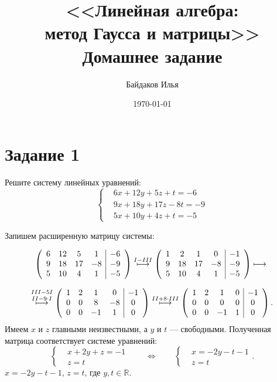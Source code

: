 \documentclass[a4paper,12pt]{article}
\begin{document}
\title{<<Линейная алгебра:\\ метод Гаусса и матрицы>>\\ \vspace{12pt} Домашнее задание}
\author{Байдаков Илья}
\date{\today}
\maketitle


\section*{Задание 1}
Решите систему линейных уравнений:
$$
\left\{
\begin{aligned}
&6x + 12y + 5z + t = -6\\
&9x + 18y + 17z -8t = -9\\
&5x + 10y + 4z + t = -5
\end{aligned}
\right.
$$

 Запишем расширенную матрицу системы:

$$ \left(\begin{array}{cccc|c}
6 & 12 & 5 & 1 & -6 \\
9 & 18 & 17 & -8 & -9 \\
5 & 10 & 4 & 1 & -5
\end{array} \right)
\overset{I-III}{\longmapsto}
\left(\begin{array}{cccc|c}
1 & 2 & 1 & 0 & -1 \\
9 & 18 & 17 & -8 & -9 \\
5 & 10 & 4 & 1 & -5
\end{array} \right)
\longmapsto \\ $$

$$ \overset{III-5I}{\overset{II-9\cdot I}{\longmapsto}}
\left(\begin{array}{cccc|c}
1 & 2 & 1 & 0 & -1 \\
0 & 0 & 8 & -8 & 0 \\
0 & 0 & -1 & 1 & 0
\end{array} \right)
\overset{II+8\cdot III}{\longmapsto}
\left(\begin{array}{cccc|c}
1 & 2 & 1 & 0 & -1 \\
0 & 0 & 0 & 0 & 0 \\
0 & 0 & -1 & 1 & 0
\end{array} \right).\\ $$
Имеем $x$ и $z$ главными неизвестными, а $y$ и $t$ --- свободными. Полученная матрица соответствует системе уравнений:
$$
\left\{
\begin{aligned}
&x + 2y + z = -1\\
&z = t
\end{aligned}
\right.
\qquad \Leftrightarrow \qquad
\left\{
\begin{aligned}
&x = -2y - t -1\\
&z = t
\end{aligned}
\right. .
$$
\vspace{1ex}
 $x = -2y - t -1$, $z = t$, где $y, t \in \mathbb{R}$.
\end{document}
